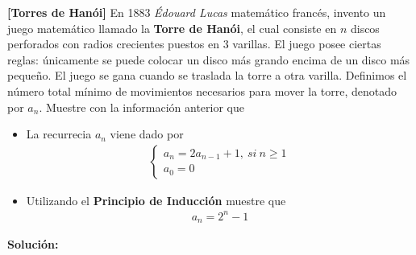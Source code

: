 \documentclass[12pt]{book}
\begin{document}
\begin{prob}{}{}
\textbf{[Torres de Hanói]} En 1883 
\emph{Édouard Lucas} matemático francés, invento un juego matemático llamado la \textbf{Torre de Hanói}, el cual consiste en $n$ discos perforados con radios crecientes puestos en 3 varillas. El juego posee ciertas reglas: únicamente se puede colocar un disco más grando encima de un disco más pequeño. El juego se gana cuando se traslada la torre a otra varilla. Definimos el número total mínimo de movimientos necesarios para mover la torre, denotado por $a_n$. Muestre con la información anterior que 

\begin{itemize}
    \item[\textbf{a)}] La recurrecia $a_n$ viene dado por 
\begin{align*}
    \begin{cases}
        a_n=2a_{n-1}+1, \ si \ n\geq 1 \\
        a_0=0
    \end{cases}
\end{align*}
    \item[\textbf{b)}] Utilizando el \textbf{Principio de Inducción} muestre que 
    \begin{align*}
        a_n=2^n-1
    \end{align*}
\end{itemize}
\end{prob}
\textbf{Solución:}
\end{document}
